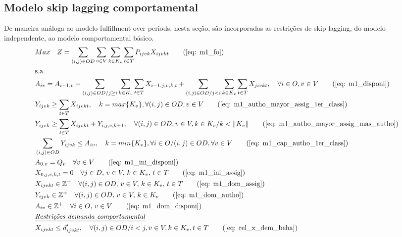 \subsection{Modelo skip lagging comportamental}
De maneira análoga ao modelo fulfillment over periods, nesta seção, são incorporadas as restrições de skip lagging, do modelo independente, ao modelo comportamental básico.
\allowdisplaybreaks
\begin{align}
	& Max \quad Z = \sum_{(i,j)\in OD} \sum_{v\in V} \sum_{k\in K_v} \sum_{t\in T} P_{ijvk} X_{ijvkt}     \tag{\ref{eq: m1_fo}}   \\
	& \text{s.a.}  \notag \\
	& A_{iv} = A_{i-1,v} - \sum_{(i,j) \in OD/j \geq i} \sum_{k\in K_v}\sum_{t\in T}X_{i-1,j,v,k,t} + \sum_{(i,j) \in OD/j<i} \sum_{k\in K_v}\sum_{t\in T}X_{jivkt}, \quad \forall i \in O, v \in V   \tag{\ref{eq: m1_disponi}} \\
	& Y_{ijvk} \geq  \sum_{t \in T} X_{ijvkt},  \quad k = max\{K_v\}, \forall(i,j) \in OD ,v \in V     \tag{\ref{eq: m1_autho_mayor_assig_1er_class}} \\
	& Y_{ijvk} \geq  \sum_{t \in T} X_{ijvkt} + Y_{i,j,v,k + 1} , \quad \forall(i,j) \in OD, v \in V, k \in K_v / k < \lVert K_v \rVert   \tag{\ref{eq: m1_autho_mayor_assig_mas_autho}} \\
	& \sum_{(i,j) \in OD} Y_{ijvk} \leq A_{iv}, \quad  k = min\{K_v\}, \forall i \in O / (i,j) \in OD,   \forall v \in V       \tag{\ref{eq: m1_cap_autho_1er_class}} \\
	& A_{0,v} = Q_v \quad \forall v \in V  \tag{\ref{eq: m1_ini_disponi}} \\ 
	& X_{0,j,v,k,t} = 0 \quad \forall j \in D,\, v \in V,\, k \in K_v,\, t \in T  \tag{\ref{eq: m1_ini_assig}} \\ 
	& X_{ijvkt} \in \mathbb{Z}^+ \quad \forall(i,j) \in OD,\, v \in V,\, k \in K_v,\, t \in T  \tag{\ref{eq: m1_dom_assig}} \\ 
	& Y_{ijvk} \in \mathbb{Z}^+ \quad \forall(i,j) \in OD,\, v \in V,\, k \in K_v  \tag{\ref{eq: m1_dom_autho}} \\ 
	& A_{iv} \in \mathbb{Z}^+ \quad \forall i \in O,\, v \in V  \tag{\ref{eq: m1_dom_disponi}} \\
	& \textit{\underline{Restrições demanda comportamental}}         \notag   \\
	& X_{ijvkt} \leq d'_{ijvkt},  \quad \forall (i,j) \in OD / i < j  ,v \in V, k \in K_v, t\in T   \tag{\ref{eq: rel_x_dem_beha}} \\

\end{align}
